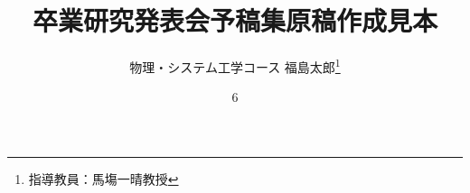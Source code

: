 \documentclass{proceedings}
\title{卒業研究発表会予稿集原稿作成見本}
\author{物理・システム工学コース \quad 福島太郎\thanks{指導教員：馬塲一晴教授}}
\date{6}
\begin{document}
    \maketitle

    
    \vspace{5mm}

    \begin{multicols}{2}
        
        
        
        
        
        
    \end{multicols}
    \vspace{-3\baselineskip} %
\end{document}
